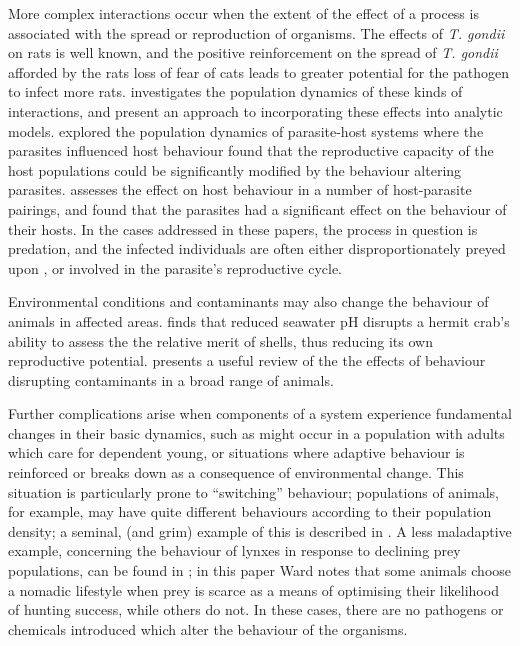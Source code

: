 More complex interactions occur when the extent of the effect of a
process is associated with the spread or reproduction of
organisms. The effects of \emph{T. gondii} on
rats \cite{berdoy2000fatal} is well known, and the positive
reinforcement on the spread of \emph{T. gondii} afforded by the rats
loss of fear of cats leads to greater potential for the pathogen to
infect more rats.   investigates the
population dynamics of these kinds of interactions, and present an
approach to incorporating these effects into analytic
models. \cite{dobson1988population} explored the population dynamics
of parasite-host systems where the parasites influenced host behaviour
found that the reproductive capacity of the host populations could be
significantly modified by the behaviour altering
parasites.  \cite{poulin1994meta} assesses the effect on host
behaviour in a number of host-parasite pairings, and found that the
parasites had a significant effect on the behaviour of their hosts.
In the cases addressed in these papers, the process in question is
predation, and the infected individuals are often either
disproportionately preyed upon \cite{dobben1952food}, or involved in
the parasite's reproductive cycle.

Environmental conditions and contaminants may also change the
behaviour of animals in affected areas. \cite{de2011reduced} finds
that reduced seawater pH disrupts a hermit crab's ability to assess
the the relative merit of shells, thus reducing its own reproductive
potential. \cite{zala2004abnormal} presents a useful review of the
the effects of behaviour disrupting contaminants in a broad range of
animals.

Further complications arise when components of a system experience
fundamental changes in their basic dynamics, such as might occur in a
population with adults which care for dependent young, or situations
where adaptive behaviour is reinforced or breaks down as a consequence
of environmental change.  This situation is particularly prone to
``switching'' behaviour; populations of animals, for example, may have
quite different behaviours according to their population density; a
seminal, (and grim) example of this is described in
\citet{calhoun1973death}. A less maladaptive example, concerning the
behaviour of lynxes in response to declining prey populations, can be
found in \citet{ward1985behavioural}; in this paper Ward notes that
some animals choose a nomadic lifestyle when prey is scarce as a means
of optimising their likelihood of hunting success, while others do not.
In these cases, there are no pathogens or chemicals introduced which
alter the behaviour of the organisms.


